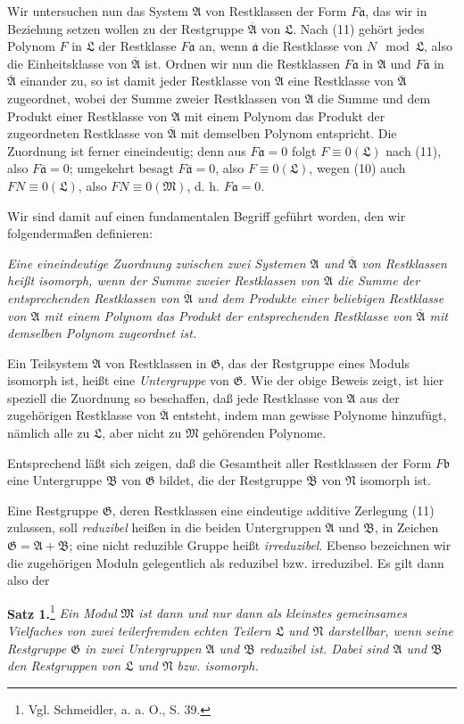 \documentclass[11pt]{article}
\newcommand{\mM}{\mathfrak{M}}
\newcommand{\mN}{\mathfrak{N}}
\newcommand{\mL}{\mathfrak{L}}
\newcommand{\mG}{\mathfrak{G}}
\newcommand{\mA}{\mathfrak{A}}
\newcommand{\mB}{\mathfrak{B}}
\newcommand{\ma}{\mathfrak{a}}
\newcommand{\mb}{\mathfrak{b}}
\newcommand{\mbarA}{\overline{\mathfrak{A}}}
\newcommand{\mbarB}{\overline{\mathfrak{B}}}
\newcommand{\bara}{\overline{\mathfrak{a}}}
\begin{document}
Wir untersuchen nun das System $\mA$ von Restklassen der Form $F\ma$, das wir in Beziehung setzen wollen zu der Restgruppe $\mbarA$ von $\mL$. Nach (11) gehört jedes Polynom $F$ in $\mL$ der Restklasse $F\ma$ an, wenn $\bara$ die Restklasse von $N\mod\mL$, also die Einheitsklasse von $\mbarA$ ist. Ordnen wir nun die Restklassen $F\ma$ in $\mA$ und $F\bara$ in $\mbarA$ einander zu, so ist damit jeder Restklasse von $\mA$ eine Restklasse von $\mbarA$ zugeordnet, wobei der Summe zweier Restklassen von $\mA$ die Summe und dem Produkt einer Restklasse von $\mA$ mit einem Polynom das Produkt der zugeordneten Restklasse von $\mbarA$ mit demselben Polynom entspricht. Die Zuordnung ist ferner eineindeutig; denn aus $F\ma=0$ folgt $F\equiv0(\mL)$ nach (11), also $F\bara=0$; umgekehrt besagt $F\bara=0$, also $F\equiv0(\mL)$, wegen (10) auch $FN\equiv0(\mL)$, also $FN\equiv0(\mM)$, d. h. $F\ma=0$.

Wir sind damit auf einen fundamentalen Begriff geführt worden, den wir folgendermaßen definieren:

\emph{Eine eineindeutige Zuordnung zwischen zwei Systemen $\mA$ und $\mbarA$ von Restklassen heißt isomorph, wenn der Summe zweier Restklassen von $\mA$ die Summe der entsprechenden Restklassen von $\mbarA$ und dem Produkte einer beliebigen Restklasse von $\mA$ mit einem Polynom das Produkt der entsprechenden Restklasse von $\mbarA$ mit demselben Polynom zugeordnet ist.}

Ein Teilsystem $\mA$ von Restklassen in $\mG$, das der Restgruppe eines Moduls isomorph ist, heißt eine \emph{Untergruppe} von $\mG$. Wie der obige Beweis zeigt, ist hier speziell die Zuordnung so beschaffen, daß jede Restklasse von $\mA$ aus der zugehörigen Restklasse von $\mbarA$ entsteht, indem man gewisse Polynome hinzufügt, nämlich alle zu $\mL$, aber nicht zu $\mM$ gehörenden Polynome.

Entsprechend läßt sich zeigen, daß die Gesamtheit aller Restklassen der Form $F\mb$ eine Untergruppe $\mB$ von $\mG$ bildet, die der Restgruppe $\mbarB$ von $\mN$ isomorph ist.

Eine Restgruppe $\mG$, deren Restklassen eine eindeutige additive Zerlegung (11) zulassen, soll \emph{reduzibel} heißen in die beiden Untergruppen $\mA$ und $\mB$, in Zeichen $\mG=\mA+\mB$; eine nicht reduzible Gruppe heißt \emph{irreduzibel}. Ebenso bezeichnen wir die zugehörigen Moduln gelegentlich als reduzibel bzw. irreduzibel. Es gilt dann also der

\textbf{Satz 1.}\footnote{Vgl. Schmeidler, a. a. O., S. 39.} \emph{Ein Modul $\mM$ ist dann und nur dann als kleinstes gemeinsames Vielfaches von zwei teilerfremden echten Teilern $\mL$ und $\mN$ darstellbar, wenn seine Restgruppe $\mG$ in zwei Untergruppen $\mA$ und $\mB$ reduzibel ist. Dabei sind $\mA$ und $\mB$ den Restgruppen von $\mL$ und $\mN$ bzw. isomorph.}
\end{document}

